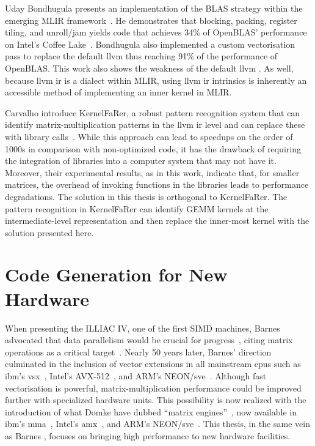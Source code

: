 \documentclass[\main/thesis.tex]{subfiles}
\begin{document}
Uday Bondhugula presents an implementation of the BLAS strategy within the emerging MLIR framework~\autocite{bondhugula2020high}.
He demonstrates that blocking, packing, register tiling, and unroll/jam yields code that achieves 34\% of OpenBLAS' performance on Intel's Coffee Lake~\autocite{bondhugula2020high}.
Bondhugula also implemented a custom \gls{vectorisation} pass to replace the default \gls{llvm}  thus reaching 91\% of the performance of OpenBLAS.
This work also shows the weakness of the default \gls{llvm} .
As well, because \gls{llvm} \gls{ir} is a dialect within MLIR, using \gls{llvm} \gls{ir} \glspl{intrinsic} is inherently an accessible method of implementing an inner kernel in MLIR.

Carvalho \etal introduce KernelFaRer, a robust pattern recognition system that can identify matrix-multiplication patterns in the \gls{llvm} \gls{ir} level and can replace these with library calls~\autocite{carvalho2021kernelfarer}.
While this approach can lead to speedups on the order of 1000s in comparison with non-optimized code, it has the drawback of requiring the integration of libraries into a computer system that may not have it.
Moreover, their experimental results, as in this work, indicate that, for smaller matrices, the overhead of invoking functions in the libraries leads to performance degradations.
The solution in this thesis is orthogonal to KernelFaRer.
The pattern recognition in  KernelFaRer can identify GEMM kernels at the intermediate-level representation and then replace the inner-most kernel with the solution presented here.

\section{Code Generation for New Hardware}
When presenting the ILLIAC IV, one of the first SIMD machines, Barnes \etal advocated that data parallelism would be crucial for progress~\autocite{barnes1968illiac}, citing matrix operations as a critical target~\autocite{kuck1968illiac}.
Nearly 50 years later, Barnes' direction culminated in the inclusion of vector extensions in all mainstream \glspl{cpu} such as \gls{ibm}'s \gls{vsx}~\autocite{PowerISA}, Intel's AVX-512~\autocite{IntelISA}, and ARM's NEON/\gls{sve}~\autocite{ArmISA}.
Although fast \gls{vectorisation} is powerful, matrix-multiplication performance could be improved further with specialized hardware units.
This possibility is now realized with the introduction of what Domke \etal have dubbed ``matrix engines''~\autocite{domke2020matrix}, now available in \gls{ibm}'s \gls{mma}~\autocite{PowerISA}, Intel's \gls{amx}~\autocite{IntelISA}, and ARM's NEON/\gls{sve}~\autocite{ArmISA}.
This thesis, in the same vein as Barnes \etal, focuses on bringing high performance to new hardware facilities.
\end{document}
